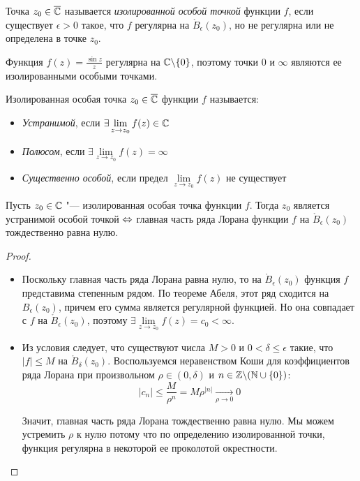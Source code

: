 \begin{definition}
	Точка $z_0 \in \overline{\mathbb{C}}$ называется \textit{изолированной особой точкой} функции $f$, если существует $\epsilon > 0$ такое, что $f$ регулярна на $\mathring B_\epsilon(z_0)$, но не регулярна или не определена в точке $z_0$.
\end{definition}

\begin{unnecessary}
    \begin{example}
    	Функция $f(z) = \frac{\sin{z}}{z}$ регулярна на $\mathbb{C} \backslash \{0\}$, поэтому точки $0$ и $\infty$ являются ее изолированными особыми точками.
    \end{example}
\end{unnecessary}

\begin{definition}
	Изолированная особая точка $z_0 \in \overline{\mathbb{C}}$ функции $f$ называется:
	\begin{itemize}
		\item \textit{Устранимой}, если $\exists \lim\limits_{z \to z_0} f(z) \in \mathbb{C}$
		\item \textit{Полюсом}, если $\exists \lim\limits_{z \to z_0} f(z) = \infty$
		\item \textit{Существенно особой}, если предел $\lim\limits_{z \to z_0} f(z)$ не существует
	\end{itemize}
\end{definition}

\begin{proposition}
\label{fixable-point-lorain}
	Пусть $z_0 \in \mathbb{C}$ "--- изолированная особая точка функции $f$. Тогда $z_0$ является устранимой особой точкой $\Leftrightarrow$ главная часть ряда Лорана функции $f$ на $\mathring B_\epsilon(z_0)$ тождественно равна нулю.
\end{proposition}

\begin{proof}~
	\begin{itemize}
		\item[$\la$]Поскольку главная часть ряда Лорана равна нулю, то на $\mathring B_\epsilon(z_0)$ функция $f$ представима степенным рядом. По теореме Абеля, этот ряд сходится на $B_\epsilon(z_0)$, причем его сумма является регулярной функцией. Но она совпадает с $f$ на $\mathring B_\epsilon(z_0)$, поэтому $\exists \lim\limits_{z \to z_0}f(z) = c_0 < \infty$.
		
		\item[$\ra$]Из условия следует, что существуют числа $M > 0$ и $0 < \delta \leqslant \epsilon$ такие, что $|f| \leqslant M$ на $\mathring B_\delta(z_0)$. Воспользуемся неравенством Коши для коэффициентов ряда Лорана при произвольном $\rho \in (0, \delta)$ и $n \in \mathbb{Z} \backslash (\mathbb{N} \cup \{0\})$:
		\[|c_n| \leqslant \frac{M}{\rho^n} = M\rho^{|n|} \xrightarrow[\rho \to 0]{} 0\]
		
		Значит, главная часть ряда Лорана тождественно равна нулю. Мы можем устремить $\rho$ к нулю потому что по определению изолированной точки, функция регулярна в некоторой ее проколотой окрестности.\qedhere
	\end{itemize}
\end{proof}

